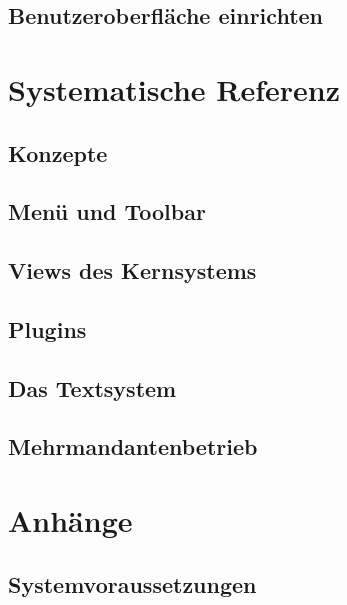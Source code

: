\documentclass[paper=a4,BCOR8.25mm,twoside]{scrbook}
\begin{document}
\chapter{Benutzeroberfläche einrichten}
	\label{customize}
	

\part{Systematische Referenz}
\chapter{Konzepte}
	
\chapter{Menü und Toolbar} 					
	
\chapter{Views des Kernsystems}
	
	
	
	
	
	
	
	
\chapter{Plugins}
	
	
	
	
	
\chapter{Das Textsystem}
	
	
	


\chapter{Mehrmandantenbetrieb}
	
	
\part{Anhänge}
\appendix

\chapter{Systemvoraussetzungen}
	
\end{document}
